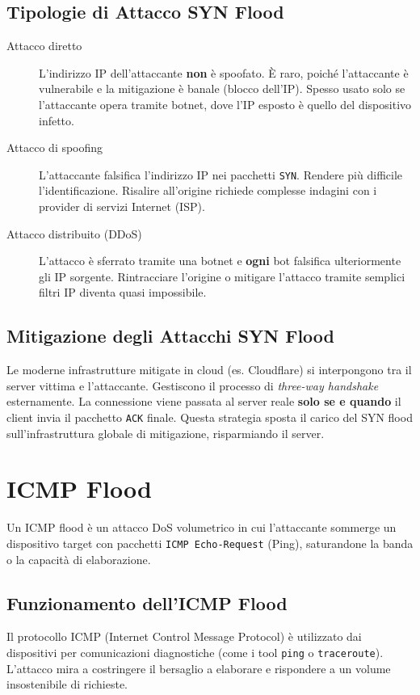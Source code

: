 \subsection{Tipologie di Attacco SYN Flood}
\begin{description}
    \item[Attacco diretto] L'indirizzo IP dell'attaccante \textbf{non} è spoofato. È raro, poiché l'attaccante è vulnerabile e la mitigazione è banale (blocco dell'IP). Spesso usato solo se l'attaccante opera tramite botnet, dove l'IP esposto è quello del dispositivo infetto.
    \item[Attacco di spoofing] L'attaccante falsifica l'indirizzo IP nei pacchetti \texttt{SYN}. Rendere più difficile l'identificazione. Risalire all'origine richiede complesse indagini con i provider di servizi Internet (ISP).
    \item[Attacco distribuito (DDoS)] L'attacco è sferrato tramite una botnet e \textbf{ogni} bot falsifica ulteriormente gli IP sorgente. Rintracciare l'origine o mitigare l'attacco tramite semplici filtri IP diventa quasi impossibile.
\end{description}

\subsection{Mitigazione degli Attacchi SYN Flood}
Le moderne infrastrutture mitigate in cloud (es. Cloudflare) si interpongono tra il server vittima e l'attaccante. Gestiscono il processo di \textit{three-way handshake} esternamente. La connessione viene passata al server reale \textbf{solo se e quando} il client invia il pacchetto \texttt{ACK} finale. Questa strategia sposta il carico del SYN flood sull'infrastruttura globale di mitigazione, risparmiando il server.

\section{ICMP Flood}

\begin{defbox}
Un ICMP flood è un attacco DoS volumetrico in cui l'attaccante sommerge un dispositivo target con pacchetti \texttt{ICMP Echo-Request} (Ping), saturandone la banda o la capacità di elaborazione.
\end{defbox}

\subsection{Funzionamento dell'ICMP Flood}
Il protocollo ICMP (Internet Control Message Protocol) è utilizzato dai dispositivi per comunicazioni diagnostiche (come i tool \texttt{ping} o \texttt{traceroute}). L'attacco mira a costringere il bersaglio a elaborare e rispondere a un volume insostenibile di richieste.

